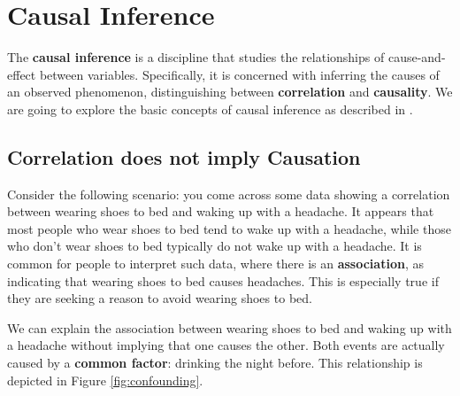 \section{Causal Inference}

The \textbf{causal inference} is a discipline that studies the relationships
of cause-and-effect between variables. Specifically, it is concerned with inferring
the causes of an observed phenomenon,
distinguishing between \textbf{correlation} and \textbf{causality}.
We are going to explore the basic concepts of causal inference
as described in \cite{Neal_2020a}.

\subsection{Correlation does not imply Causation}
\label{sec:correlation}

Consider the following scenario: you come across some data showing a correlation
between wearing shoes to bed and waking up with a headache.
It appears that most people who wear shoes to bed tend to wake up
with a headache, while those who don’t wear shoes to bed typically
do not wake up with a headache.
It is common for people to interpret such data,
where there is an \textbf{association},
as indicating that wearing shoes
to bed causes headaches. This is especially true if they are
seeking a reason to avoid wearing shoes to bed.

We can explain the association between wearing shoes to bed and waking
up with a headache without implying that one causes the other.
Both events are actually caused by a \textbf{common factor}:
drinking the night before. This relationship is depicted
in Figure \ref{fig:confounding}.

